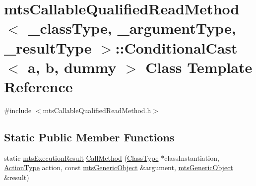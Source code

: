 \hypertarget{classmts_callable_qualified_read_method_1_1_conditional_cast}{\section{mts\-Callable\-Qualified\-Read\-Method$<$ \-\_\-class\-Type, \-\_\-argument\-Type, \-\_\-result\-Type $>$\-:\-:Conditional\-Cast$<$ a, b, dummy $>$ Class Template Reference}
\label{classmts_callable_qualified_read_method_1_1_conditional_cast}
}


{\ttfamily \#include $<$mts\-Callable\-Qualified\-Read\-Method.\-h$>$}

\subsection*{Static Public Member Functions}
\begin{DoxyCompactItemize}
\item 
static \hyperlink{classmts_execution_result}{mts\-Execution\-Result} \hyperlink{classmts_callable_qualified_read_method_1_1_conditional_cast_a98e546fb629e8337761e8c5fde591b51}{Call\-Method} (\hyperlink{classmts_callable_qualified_read_method_a6cfee5c3c3c49c691c2f5176ea79d735}{Class\-Type} $\ast$class\-Instantiation, \hyperlink{classmts_callable_qualified_read_method_ac6fc895837df0b66d84405f3ee01f153}{Action\-Type} action, const \hyperlink{classmts_generic_object}{mts\-Generic\-Object} \&argument, \hyperlink{classmts_generic_object}{mts\-Generic\-Object} \&result)
\end{DoxyCompactItemize}


